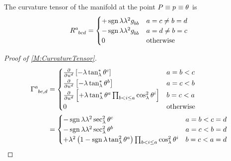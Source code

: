 \documentclass[../methodology.tex]{subfiles}
\begin{document}
\begin{lemma}\label{M:CurvatureTensor}
  The curvature tensor of the manifold
  at the point \(P\equiv\tensor{p}{}\equiv\tensor{\theta}{}\)
  is
  \[
    \tensor{R}{^a_b_c_d}
    =
    \begin{cases}
      +\sign{\lambda}\lambda^2\tensor{g}{_b_b} & \text{\(a=c\ne b=d\)} \\
      -\sign{\lambda}\lambda^2\tensor{g}{_b_b} & \text{\(a=d\ne b=c\)} \\
      0                                        & \text{otherwise}      \\
    \end{cases}
  \]
\end{lemma}
\begin{proof}[Proof of \cref{M:CurvatureTensor}]
  \begin{align*}
    \tensor{\Gamma}{^a_b_c_{,d}}
     & =\begin{cases}
          \frac{\partial}{\partial\tensor{u}{^d}}\left[-\lambda\tan_\lambda^\ast\tensor{\theta}{^c}\right]                                                    & \text{\(a=b<c\)} \\
          \frac{\partial}{\partial\tensor{u}{^d}}\left[-\lambda\tan_\lambda^\ast\tensor{\theta}{^b}\right]                                                    & \text{\(a=c<b\)} \\
          \frac{\partial}{\partial\tensor{u}{^d}}\left[+\lambda\tan_\lambda^\ast\tensor{\theta}{^a}\prod_{b<i\le a}{\cos_\lambda^2\tensor{\theta}{^i}}\right] & \text{\(b=c<a\)} \\
          0                                                                                                                                                   & \text{otherwise} \\
        \end{cases} \\
     & =\begin{cases}
          -\sign{\lambda}\lambda^2\sec_\lambda^2\tensor{\theta}{^c}                                                                              & \text{\(a=b<c=d\)} \\
          -\sign{\lambda}\lambda^2\sec_\lambda^2\tensor{\theta}{^b}                                                                              & \text{\(a=c<b=d\)} \\
          +\lambda^2\left(1-\sign{\lambda}\tan_\lambda^2\tensor{\theta}{^a}\right)\prod_{b<i\le a}{\cos_\lambda^2\tensor{\theta}{^i}}            & \text{\(b=c<a=d\)} \\

\end{cases}
\end{align*}
\end{proof}
\end{document}
